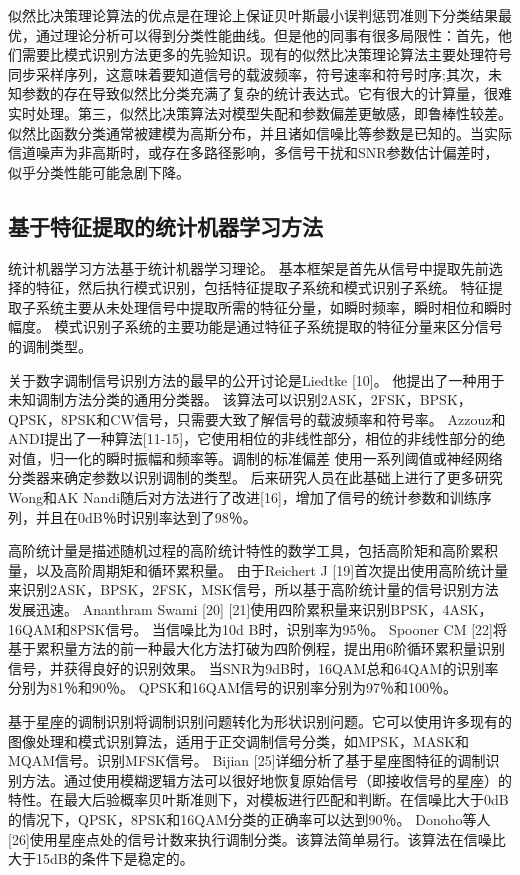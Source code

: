 似然比决策理论算法的优点是在理论上保证贝叶斯最小误判惩罚准则下分类结果最优，通过理论分析可以得到分类性能曲线。但是他的同事有很多局限性：首先，他们需要比模式识别方法更多的先验知识。现有的似然比决策理论算法主要处理符号同步采样序列，这意味着要知道信号的载波频率，符号速率和符号时序;其次，未知参数的存在导致似然比分类充满了复杂的统计表达式。它有很大的计算量，很难实时处理。第三，似然比决策算法对模型失配和参数偏差更敏感，即鲁棒性较差。似然比函数分类通常被建模为高斯分布，并且诸如信噪比等参数是已知的。当实际信道噪声为非高斯时，或存在多路径影响，多信号干扰和SNR参数估计偏差时，似乎分类性能可能急剧下降。\par
 
\subsection{基于特征提取的统计机器学习方法}

统计机器学习方法基于统计机器学习理论。 基本框架是首先从信号中提取先前选择的特征，然后执行模式识别，包括特征提取子系统和模式识别子系统。 特征提取子系统主要从未处理信号中提取所需的特征分量，如瞬时频率，瞬时相位和瞬时幅度。 模式识别子系统的主要功能是通过特征子系统提取的特征分量来区分信号的调制类型。 \par

关于数字调制信号识别方法的最早的公开讨论是Liedtke [10]。 他提出了一种用于未知调制方法分类的通用分类器。 该算法可以识别2ASK，2FSK，BPSK，QPSK，8PSK和CW信号，只需要大致了解信号的载波频率和符号率。 Azzouz和ANDI提出了一种算法[11-15]，它使用相位的非线性部分，相位的非线性部分的绝对值，归一化的瞬时振幅和频率等。调制的标准偏差 使用一系列阈值或神经网络分类器来确定参数以识别调制的类型。 后来研究人员在此基础上进行了更多研究 Wong和AK Nandi随后对方法进行了改进[16]，增加了信号的统计参数和训练序列，并且在0dB％时识别率达到了98％。\par
高阶统计量是描述随机过程的高阶统计特性的数学工具，包括高阶矩和高阶累积量，以及高阶周期矩和循环累积量。 由于Reichert J [19]首次提出使用高阶统计量来识别2ASK，BPSK，2FSK，MSK信号，所以基于高阶统计量的信号识别方法发展迅速。 Ananthram Swami [20] [21]使用四阶累积量来识别BPSK，4ASK，16QAM和8PSK信号。 当信噪比为10d B时，识别率为95％。 Spooner CM [22]将基于累积量方法的前一种最大化方法打破为四阶例程，提出用6阶循环累积量识别信号，并获得良好的识别效果。 当SNR为9dB时，16QAM总和64QAM的识别率分别为81％和90％。 QPSK和16QAM信号的识别率分别为97％和100％。\par

基于星座的调制识别将调制识别问题转化为形状识别问题。它可以使用许多现有的图像处理和模式识别算法，适用于正交调制信号分类，如MPSK，MASK和MQAM信号。识别MFSK信号。 Bijian [25]详细分析了基于星座图特征的调制识别方法。通过使用模糊逻辑方法可以很好地恢复原始信号（即接收信号的星座）的特性。在最大后验概率贝叶斯准则下，对模板进行匹配和判断。在信噪比大于0dB的情况下，QPSK，8PSK和16QAM分类的正确率可以达到90％。 Donoho等人[26]使用星座点处的信号计数来执行调制分类。该算法简单易行。该算法在信噪比大于15dB的条件下是稳定的。\par

